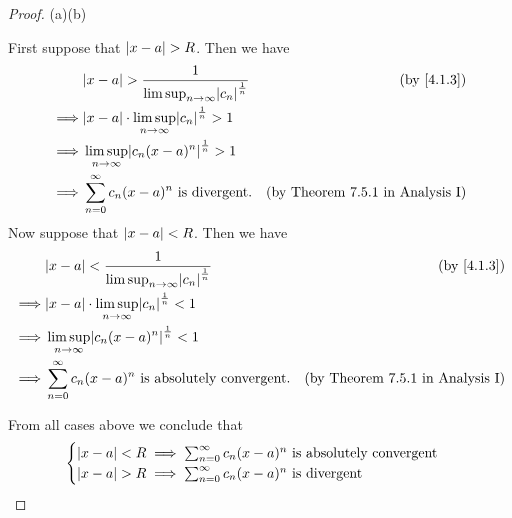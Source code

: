 \begin{proof}{(a)}{(b)}
\begin{itemize}
          First suppose that \(\left\lvert x - a\right\rvert > R\).
          Then we have
          \begin{align*}
                     & \abs{x - a} > \frac{1}{\limsup_{n \to \infty} \abs{c_n}^{\frac{1}{n}}} & \text{(by \cref{4.1.3})}                \\
            \implies & \abs{x - a} \cdot \limsup_{n \to \infty} \abs{c_n}^{\frac{1}{n}} > 1                                             \\
            \implies & \limsup_{n \to \infty} \abs{c_n (x - a)^n}^{\frac{1}{n}} > 1                                                     \\
            \implies & \sum_{n = 0}^\infty c_n (x - a)^n \text{ is divergent}.                & \text{(by Theorem 7.5.1 in Analysis I)}
          \end{align*}
          Now suppose that \(\left\lvert x - a\right\rvert < R\).
          Then we have
          \begin{align*}
                     & \abs{x - a} < \frac{1}{\limsup_{n \to \infty} \abs{c_n}^{\frac{1}{n}}} & \text{(by \cref{4.1.3})}                \\
            \implies & \abs{x - a} \cdot \limsup_{n \to \infty} \abs{c_n}^{\frac{1}{n}} < 1                                             \\
            \implies & \limsup_{n \to \infty} \abs{c_n (x - a)^n}^{\frac{1}{n}} < 1                                                     \\
            \implies & \sum_{n = 0}^\infty c_n (x - a)^n \text{ is absolutely convergent}.    & \text{(by Theorem 7.5.1 in Analysis I)}
          \end{align*}
  \end{itemize}
  From all cases above we conclude that
  \[
    \begin{cases}
      \left\lvert x - a\right\rvert < R \implies \sum_{n = 0}^\infty c_n (x - a)^n \text{ is absolutely convergent} \\
      \left\lvert x - a\right\rvert > R \implies \sum_{n = 0}^\infty c_n (x - a)^n \text{ is divergent}
    \end{cases}
  \]
\end{proof}

